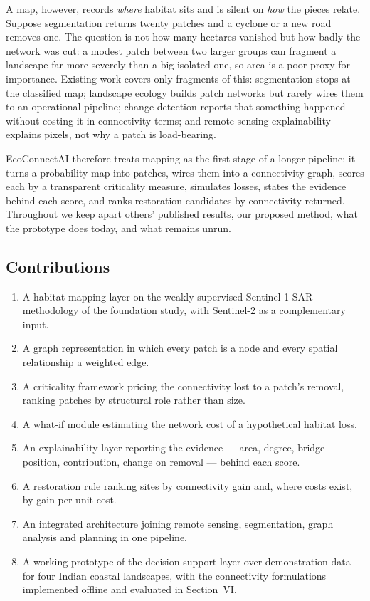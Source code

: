 \documentclass[conference]{IEEEtran}
\begin{document}
A map, however, records \emph{where} habitat sits and is silent on \emph{how} the pieces relate. Suppose segmentation returns twenty patches and a cyclone or a new road removes one. The question is not how many hectares vanished but how badly the network was cut: a modest patch between two larger groups can fragment a landscape far more severely than a big isolated one, so area is a poor proxy for importance. Existing work covers only fragments of this: segmentation stops at the classified map; landscape ecology builds patch networks but rarely wires them to an operational pipeline; change detection reports that something happened without costing it in connectivity terms; and remote-sensing explainability explains pixels, not why a patch is load-bearing.

EcoConnectAI therefore treats mapping as the first stage of a longer pipeline: it turns a probability map into patches, wires them into a connectivity graph, scores each by a transparent criticality measure, simulates losses, states the evidence behind each score, and ranks restoration candidates by connectivity returned. Throughout we keep apart others' published results, our proposed method, what the prototype does today, and what remains unrun.

\subsection{Contributions}

\begin{enumerate}[leftmargin=*,itemsep=0pt,parsep=0pt,topsep=1pt]
    \item A habitat-mapping layer on the weakly supervised Sentinel-1 SAR methodology of the foundation study, with Sentinel-2 as a complementary input.
    \item A graph representation in which every patch is a node and every spatial relationship a weighted edge.
    \item A criticality framework pricing the connectivity lost to a patch's removal, ranking patches by structural role rather than size.
    \item A what-if module estimating the network cost of a hypothetical habitat loss.
    \item An explainability layer reporting the evidence --- area, degree, bridge position, contribution, change on removal --- behind each score.
    \item A restoration rule ranking sites by connectivity gain and, where costs exist, by gain per unit cost.
    \item An integrated architecture joining remote sensing, segmentation, graph analysis and planning in one pipeline.
    \item A working prototype of the decision-support layer over demonstration data for four Indian coastal landscapes, with the connectivity formulations implemented offline and evaluated in Section~VI.
\end{enumerate}
\end{document}
